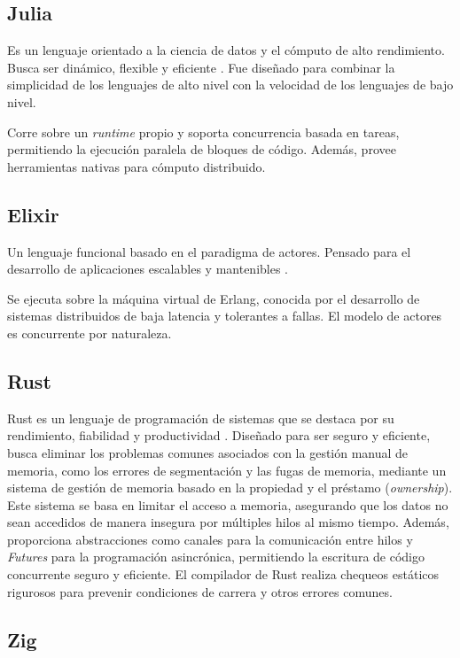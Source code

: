 \documentclass[11pt]{article}
\let\Oldsubsection\subsection
\renewcommand{\subsection}{\FloatBarrier\Oldsubsection}
\newcommand{\english}[1]{\textit{#1}}
\begin{document}
\subsection{Julia}

Es un lenguaje orientado a la ciencia de datos y el cómputo de alto rendimiento. Busca ser dinámico, flexible y eficiente \cite{com:julia}. Fue diseñado para combinar la simplicidad de los lenguajes de alto nivel con la velocidad de los lenguajes de bajo nivel.

Corre sobre un \english{runtime} propio y soporta concurrencia basada en tareas, permitiendo la ejecución paralela de bloques de código. Además, provee herramientas nativas para cómputo distribuido.

\subsection{Elixir}

Un lenguaje funcional basado en el paradigma de actores. Pensado para el desarrollo de aplicaciones escalables y mantenibles \cite{com:elixir}.

Se ejecuta sobre la máquina virtual de Erlang, conocida por el desarrollo de sistemas distribuidos de baja latencia y tolerantes a fallas. El modelo de actores es concurrente por naturaleza.

\subsection{Rust}

Rust es un lenguaje de programación de sistemas que se destaca por su rendimiento, fiabilidad y productividad \cite{com:rust}. Diseñado para ser seguro y eficiente, busca eliminar los problemas comunes asociados con la gestión manual de memoria, como los errores de segmentación y las fugas de memoria, mediante un sistema de gestión de memoria basado en la propiedad y el préstamo (\english{ownership}).
Este sistema se basa en limitar el acceso a memoria, asegurando que los datos no sean accedidos de manera insegura por múltiples hilos al mismo tiempo. Además, proporciona abstracciones como canales para la comunicación entre hilos y \english{Futures} para la programación asincrónica, permitiendo la escritura de código concurrente seguro y eficiente. El compilador de Rust realiza chequeos estáticos rigurosos para prevenir condiciones de carrera y otros errores comunes.

\subsection{Zig}
\end{document}
